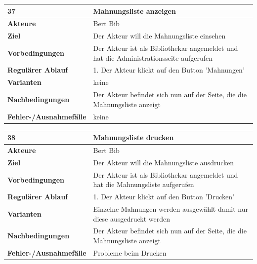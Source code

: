 \documentclass[fontsize=12pt,paper=a4,twoside]{scrartcl}
\begin{document}
\begin{table}[htbp]
\label{37}
\begin{tabular}{|l|p{10cm}|}
\hline 
\textbf{37} & \textbf{Mahnungsliste anzeigen} \\ \hline
\textbf{Akteure} & Bert Bib\\ \hline
\textbf{Ziel} & Der Akteur will die Mahnungsliste einsehen \\ \hline
\textbf{Vorbedingungen} & Der Akteur ist als Bibliothekar angemeldet und hat die Administrationsseite 
aufgerufen \\ \hline
\textbf{Regulärer Ablauf} & 
1. Der Akteur klickt auf den Button 'Mahnungen' \\
\hline
\textbf{Varianten} & 
keine \\ \hline
\textbf{Nachbedingungen} & Der Akteur befindet sich nun auf der Seite, die die Mahnungsliste 
anzeigt\\ \hline
\textbf{Fehler-/Ausnahmefälle} & keine\\
\hline
\end{tabular}
\end{table}

\begin{table}[htbp]
\label{38}
\begin{tabular}{|l|p{10cm}|}
\hline 
\textbf{38} & \textbf{Mahnungsliste drucken} \\ \hline
\textbf{Akteure} & Bert Bib\\ \hline
\textbf{Ziel} & Der Akteur will die Mahnungsliste ausdrucken \\ \hline
\textbf{Vorbedingungen} & Der Akteur ist als Bibliothekar angemeldet und hat die Mahnungsliste 
aufgerufen \\ \hline
\textbf{Regulärer Ablauf} & 
1. Der Akteur klickt auf den Button 'Drucken' \\
\hline
\textbf{Varianten} & 
Einzelne Mahnungen werden ausgewählt damit nur diese ausgedruckt werden \\ \hline
\textbf{Nachbedingungen} & Der Akteur befindet sich nun auf der Seite, die die Mahnungsliste 
anzeigt\\ \hline
\textbf{Fehler-/Ausnahmefälle} & Probleme beim Drucken\\
\hline
\end{tabular}
\end{table}
\end{document}
